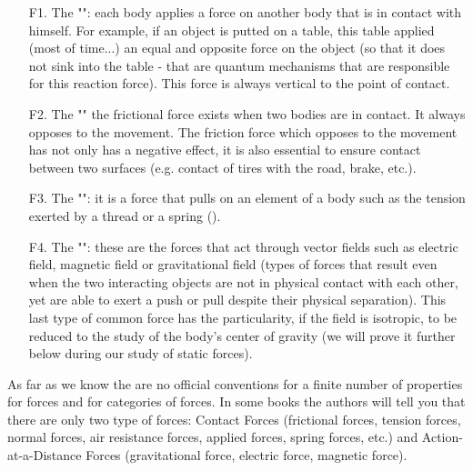 	\begin{enumerate}
		\item[F1.] The "": each body applies a force on another body that is in contact with himself. For example, if an object is putted on a table, this table applied (most of time...) an equal and opposite force on the object (so that it does not sink into the table - that are quantum mechanisms that are responsible for this reaction force). This force is always vertical to the point of contact.
		
		\item[F2.] The "" the frictional force exists when two bodies are in contact. It always opposes to the movement. The friction force which opposes to the movement has not only has a negative effect, it is also essential to ensure contact between two surfaces (e.g. contact of tires with the road, brake, etc.).
		
		\item[F3.] The "": it is a force that pulls on an element of a body such as the tension exerted by a thread or  a spring ().
		
		\item[F4.] The "": these are the forces that act through vector fields such as electric field, magnetic field or gravitational field (types of forces that result even when the two interacting objects are not in physical contact with each other, yet are able to exert a push or pull despite their physical separation). This last type of common force has the particularity, if the field is isotropic, to be reduced to the study of the body's center of gravity (we will prove it further below during our study of static forces).
	\end{enumerate}
	
	\begin{tcolorbox}[title=Remark,colframe=black,arc=10pt]
	As far as we know the are no official conventions for a finite number of properties for forces and for categories of forces. In some books the authors will tell you that there are only two type of forces: Contact Forces (frictional forces, tension forces, normal forces, air resistance forces, applied forces, spring forces, etc.) and Action-at-a-Distance Forces (gravitational force, electric force, magnetic force).
	\end{tcolorbox}
	
